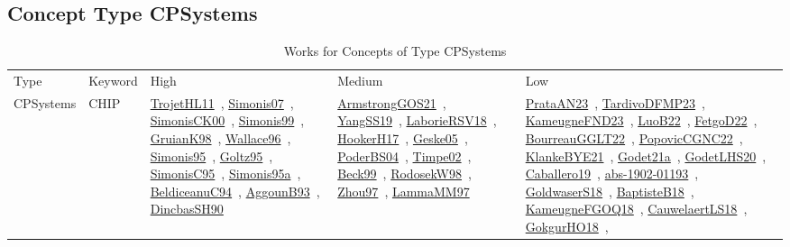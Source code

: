 \clearpage
\subsection{Concept Type CPSystems}
\label{sec:CPSystems}
{\scriptsize
\begin{longtable}{lp{3cm}>{\raggedright\arraybackslash}p{6cm}>{\raggedright\arraybackslash}p{6cm}>{\raggedright\arraybackslash}p{8cm}}
\rowcolor{white}\caption{Works for Concepts of Type CPSystems}\\ \toprule
\rowcolor{white}Type & Keyword & High & Medium & Low\\ \midrule\endhead
\bottomrule
\endfoot
CPSystems & CHIP & \href{../works/TrojetHL11.pdf}{TrojetHL11}~\cite{TrojetHL11}, \href{../works/Simonis07.pdf}{Simonis07}~\cite{Simonis07}, \href{../works/SimonisCK00.pdf}{SimonisCK00}~\cite{SimonisCK00}, \href{../works/Simonis99.pdf}{Simonis99}~\cite{Simonis99}, \href{../works/GruianK98.pdf}{GruianK98}~\cite{GruianK98}, \href{../works/Wallace96.pdf}{Wallace96}~\cite{Wallace96}, \href{../works/Simonis95.pdf}{Simonis95}~\cite{Simonis95}, \href{../works/Goltz95.pdf}{Goltz95}~\cite{Goltz95}, \href{../works/SimonisC95.pdf}{SimonisC95}~\cite{SimonisC95}, \href{../works/Simonis95a.pdf}{Simonis95a}~\cite{Simonis95a}, \href{../works/BeldiceanuC94.pdf}{BeldiceanuC94}~\cite{BeldiceanuC94}, \href{../works/AggounB93.pdf}{AggounB93}~\cite{AggounB93}, \href{../works/DincbasSH90.pdf}{DincbasSH90}~\cite{DincbasSH90} & \href{../works/ArmstrongGOS21.pdf}{ArmstrongGOS21}~\cite{ArmstrongGOS21}, \href{../works/YangSS19.pdf}{YangSS19}~\cite{YangSS19}, \href{../works/LaborieRSV18.pdf}{LaborieRSV18}~\cite{LaborieRSV18}, \href{../works/HookerH17.pdf}{HookerH17}~\cite{HookerH17}, \href{../works/Geske05.pdf}{Geske05}~\cite{Geske05}, \href{../works/PoderBS04.pdf}{PoderBS04}~\cite{PoderBS04}, \href{../works/Timpe02.pdf}{Timpe02}~\cite{Timpe02}, \href{../works/Beck99.pdf}{Beck99}~\cite{Beck99}, \href{../works/RodosekW98.pdf}{RodosekW98}~\cite{RodosekW98}, \href{../works/Zhou97.pdf}{Zhou97}~\cite{Zhou97}, \href{../works/LammaMM97.pdf}{LammaMM97}~\cite{LammaMM97} & \href{../works/PrataAN23.pdf}{PrataAN23}~\cite{PrataAN23}, \href{../works/TardivoDFMP23.pdf}{TardivoDFMP23}~\cite{TardivoDFMP23}, \href{../works/KameugneFND23.pdf}{KameugneFND23}~\cite{KameugneFND23}, \href{../works/LuoB22.pdf}{LuoB22}~\cite{LuoB22}, \href{../works/FetgoD22.pdf}{FetgoD22}~\cite{FetgoD22}, \href{../works/BourreauGGLT22.pdf}{BourreauGGLT22}~\cite{BourreauGGLT22}, \href{../works/PopovicCGNC22.pdf}{PopovicCGNC22}~\cite{PopovicCGNC22}, \href{../works/KlankeBYE21.pdf}{KlankeBYE21}~\cite{KlankeBYE21}, \href{../works/Godet21a.pdf}{Godet21a}~\cite{Godet21a}, \href{../works/GodetLHS20.pdf}{GodetLHS20}~\cite{GodetLHS20}, \href{../works/Caballero19.pdf}{Caballero19}~\cite{Caballero19}, \href{../works/abs-1902-01193.pdf}{abs-1902-01193}~\cite{abs-1902-01193}, \href{../works/GoldwaserS18.pdf}{GoldwaserS18}~\cite{GoldwaserS18}, \href{../works/BaptisteB18.pdf}{BaptisteB18}~\cite{BaptisteB18}, \href{../works/KameugneFGOQ18.pdf}{KameugneFGOQ18}~\cite{KameugneFGOQ18}, \href{../works/CauwelaertLS18.pdf}{CauwelaertLS18}~\cite{CauwelaertLS18}, \href{../works/GokgurHO18.pdf}{GokgurHO18}~\cite{GokgurHO18}, 
\end{longtable}}
